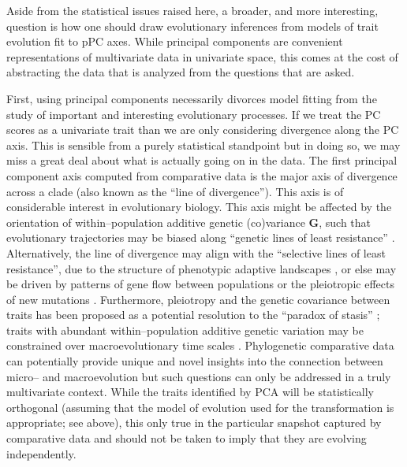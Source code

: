 \documentclass[a4paper,12pt]{article}
\begin{document}
Aside from the statistical issues raised here, a broader, and more interesting, question is how one should draw evolutionary inferences from models of trait evolution fit to pPC axes. While principal components are convenient representations of multivariate data in univariate space, this comes at the cost of abstracting the data that is analyzed from the questions that are asked. 

First, using principal components necessarily divorces model fitting from the study of important and interesting evolutionary processes. If we treat the PC scores as a univariate trait than we are only considering divergence along the PC axis. This is sensible from a purely statistical standpoint but in doing so, we may miss a great deal about what is actually going on in the data. The first principal component axis computed from comparative data is the major axis of divergence across a clade (also known as the ``line of divergence''). This axis is of considerable interest in evolutionary biology. This axis might be affected by the orientation of within--population additive genetic (co)variance $\mathbf{G}$, such that evolutionary trajectories may be biased along ``genetic lines of least resistance'' \citep[i.e., divergence occurs primarily along the leading eigenvector of $\mathbf{G}$, $G_{\text{max}}$;][]{Schluter1996, Arnoldetal2001}. Alternatively, the line of divergence may align with the ``selective lines of least resistance'', due to the structure of phenotypic adaptive landscapes \citep{Arnold2003, Jonesetal2007, Arnoldetal2008}, or else may be driven by patterns of gene flow between populations \citep{Guillaume2007} or the pleiotropic effects of new mutations \citep{Jonesetal2007, Hether2013, Houle2013}. Furthermore, pleiotropy and the genetic covariance between traits has been proposed as a potential resolution to the ``paradox of stasis'' \citep{HansenHoule2004}; traits with abundant within--population additive genetic variation may be constrained over macroevolutionary time scales \citep{Kirkpatrick2009, WalshBlows2009}. Phylogenetic comparative data can potentially provide unique and novel insights into the connection between micro-- and macroevolution \citep{Hohenlohe2008} but such questions can only be addressed in a truly multivariate context. While the traits identified by PCA will be statistically orthogonal (assuming that the model of evolution used for the transformation is appropriate; see above), this only true in the particular snapshot captured by comparative data and should not be taken to imply that they are evolving independently. 
\end{document}
